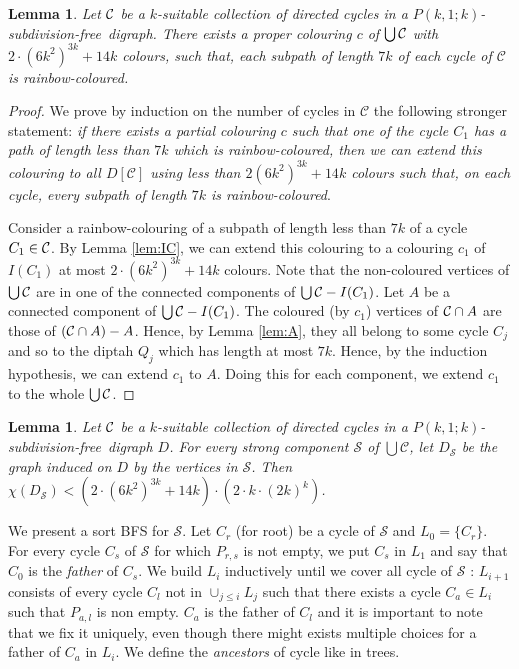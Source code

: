 \documentclass[utf8,10pt]{article}
\theoremstyle{plain}
\newtheorem{lemma}[theorem]{Lemma}
\theoremstyle{definition}
\theoremstyle{remark}
\newcommand{\dr}{ k \cdot (2k)^k}
\newcommand{\col}{(6k^2)^{3k}}
\newcommand{\free}{subdivision-free}
\begin{document}
\begin{lemma}\label{lem:col-union-cycle}
Let ${\cal C}$ be a $k$-suitable collection of directed cycles in a $P(k,1;k)$-\free\ digraph.
There exists a proper colouring $c$ of $\bigcup{\cal C}$ with $2\cdot \col + 14k$ colours, such that, each subpath of length $7k$ of each cycle of $\mathcal{C}$ is rainbow-coloured.
\end{lemma}
\begin{proof}
We prove by induction on the number of cycles in $\mathcal{C}$ the following stronger statement:
{\it if there exists
a partial colouring $c$ such that one of the cycle $C_1$ has a path of length less than $7k$
which is rainbow-coloured, then we can extend this colouring to all $D[\mathcal{C}]$ using less
than $2\col +14k$ colours such that, on each cycle, every subpath of length
$7k$ is rainbow-coloured}.

Consider a rainbow-colouring of a subpath of length less than $7k$ of a cycle $C_1\in {\cal C}$.
By Lemma \ref{lem:IC}, we can extend this colouring to a colouring $c_1$ of $I(C_1)$ at most $2\cdot \col + 14k$ colours.
Note that the non-coloured vertices of $\bigcup{\cal C}$ are in one of the connected components of $\bigcup{\cal C} - I(C_1)$.
Let $A$ be a connected component of $\bigcup{\cal C} - I(C_1)$. The coloured (by $c_1$) vertices of ${\cal C}\cap A$ are those of $({\cal C}\cap A)-A$. Hence, by Lemma \ref{lem:A}, they all belong to some cycle $C_j$ and so to the diptah $Q_j$ which has length at most $7k$.
Hence, by the induction hypothesis, we can extend $c_1$ to $A$. Doing this for each component, we extend $c_1$ to the whole $\bigcup{\cal C}$.
\end{proof}





\begin{lemma}\label{lem:DC}
Let ${\cal C}$ be a $k$-suitable collection of directed cycles in a $P(k,1;k)$-\free\ digraph $D$.
For every strong component $\mathcal{S}$ of $\bigcup \mathcal{C}$, let $D_{\mathcal{S}}$ be the graph induced 
on $D$ by the vertices in $\mathcal{S}$. Then $\chi(D_{\mathcal{S}}) < (2\cdot \col + 14k) \cdot (2 \cdot \dr)$.
\end{lemma}


We present a sort BFS for $\mathcal{S}$.
Let $C_r$ (for root) be a cycle of $\mathcal{S}$ and $L_0 = \{C_r\}$. For every cycle $C_s$ of $\mathcal{S}$ for which 
$P_{r,s}$ is not empty, we put $C_s$ in $L_1$ and say that $C_0$ is the \textit{father} of $C_s$. We build $L_i$ inductively
until we cover all cycle of $\mathcal{S}$ : $L_{i+1}$ consists of every cycle $C_l$ not in $\cup_{j \leq i} L_j$ such that 
there exists a cycle $C_a \in L_i$ such that $P_{a,l}$ is non empty. $C_a$ is the father of $C_l$ and it is important to note that we 
fix it uniquely, even though there might exists multiple choices for a father of $C_a$ in $L_i$. We define the \textit{ancestors} of 
cycle like in trees.
\end{document}
